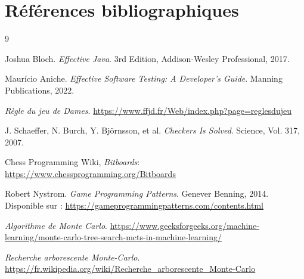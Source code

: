 \documentclass[11pt,a4paper]{article}
\begin{document}
\section{Références bibliographiques}
\begin{thebibliography}{9}

    Joshua Bloch.
    \textit{Effective Java}.
    3rd Edition, Addison-Wesley Professional, 2017.

    Maurício Aniche.
    \textit{Effective Software Testing: A Developer's Guide}.
    Manning Publications, 2022.

    \textit{Règle du jeu de Dames}.
    \url{https://www.ffjd.fr/Web/index.php?page=reglesdujeu}
    
    J. Schaeffer, N. Burch, Y. Björnsson, et al.
    \textit{Checkers Is Solved}.
    Science, Vol. 317, 2007.

    Chess Programming Wiki,
    \textit{Bitboards}:
    \url{https://www.chessprogramming.org/Bitboards}
    
    Robert Nystrom.
    \textit{Game Programming Patterns}.
    Genever Benning, 2014.
    Disponible sur : \url{https://gameprogrammingpatterns.com/contents.html}

    \textit{Algorithme de Monte Carlo}.
    \url{https://www.geeksforgeeks.org/machine-learning/monte-carlo-tree-search-mcts-in-machine-learning/}

    \textit{Recherche arborescente Monte-Carlo}.
    \url{https://fr.wikipedia.org/wiki/Recherche_arborescente_Monte-Carlo}

\end{thebibliography}


    
\end{document}

